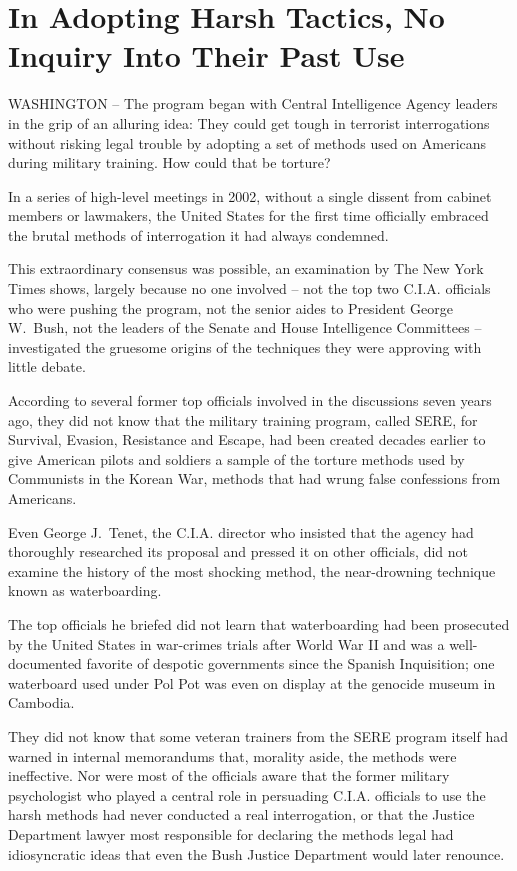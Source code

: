 \documentclass[12pt,a4paper,onecolumn]{article}
\begin{document}
\section{In Adopting Harsh Tactics, No Inquiry Into Their Past Use}

WASHINGTON -- The program began with Central Intelligence Agency leaders in the grip of an alluring
idea: They could get tough in terrorist interrogations without risking legal trouble by adopting a
set of methods used on Americans during military training. How could that be torture?

In a series of high-level meetings in 2002, without a single dissent from cabinet members or
lawmakers, the United States for the first time officially embraced the brutal methods of
interrogation it had always condemned.

This extraordinary consensus was possible, an examination by The New York Times shows, largely
because no one involved -- not the top two C.I.A. officials who were pushing the program, not the
senior aides to President George W.~Bush, not the leaders of the Senate and House Intelligence
Committees -- investigated the gruesome origins of the techniques they were approving with little
debate.

According to several former top officials involved in the discussions seven years ago, they did not
know that the military training program, called SERE, for Survival, Evasion, Resistance and Escape,
had been created decades earlier to give American pilots and soldiers a sample of the torture
methods used by Communists in the Korean War, methods that had wrung false confessions from
Americans.

Even George J.~Tenet, the C.I.A. director who insisted that the agency had thoroughly researched its
proposal and pressed it on other officials, did not examine the history of the most shocking method,
the near-drowning technique known as waterboarding.

The top officials he briefed did not learn that waterboarding had been prosecuted by the United
States in war-crimes trials after World War II and was a well-documented favorite of despotic
governments since the Spanish Inquisition; one waterboard used under Pol Pot was even on display at
the genocide museum in Cambodia.

They did not know that some veteran trainers from the SERE program itself had warned in internal
memorandums that, morality aside, the methods were ineffective. Nor were most of the officials aware
that the former military psychologist who played a central role in persuading C.I.A. officials to
use the harsh methods had never conducted a real interrogation, or that the Justice Department
lawyer most responsible for declaring the methods legal had idiosyncratic ideas that even the Bush
Justice Department would later renounce.
\end{document}
